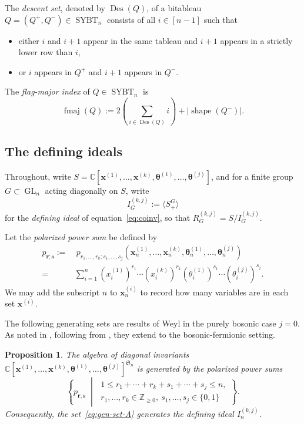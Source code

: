 \documentclass[12pt]{amsart}
\theoremstyle{plain}
\newtheorem{proposition}[theorem]{Proposition}
\theoremstyle{definition}
\DeclareMathOperator{\SYBT}{SYBT}
\DeclareMathOperator{\shape}{shape}
\DeclareMathOperator{\Des}{Des}
\DeclareMathOperator{\fmaj}{fmaj}
\DeclareMathOperator{\GL}{GL}
\newcommand{\Z}{\mathbb{Z}}
\newcommand{\C}{\mathbb{C}}
\begin{document}
The \emph{descent set}, denoted by $\Des(Q)$, of a bitableau $Q = (Q^+,Q^-) \in \SYBT_n$ consists of all $i \in [n-1]$ such that 
\begin{itemize}
\item either $i$ and $i+1$ appear in the same tableau and $i+1$ appears in a strictly lower row than $i$,
\item or $i$ appears in $Q^+$ and $i+1$ appears in $Q^-$.
\end{itemize}
The \emph{flag-major index} of $Q \in \SYBT_n$ is 
\begin{equation}
\fmaj(Q) := 2 \left(\sum_{i \in \Des(Q)} i \right) + |\shape(Q^-)|.
\end{equation}

\subsection{The defining ideals}\label{subsec:defining-ideals}
Throughout, write $S = \C[\bm{x}^{(1)}, \ldots, \bm{x}^{(k)}, \bm{\theta}^{(1)},\ldots, \bm{\theta}^{(j)}]$, and for a finite group $G \subset \GL_n$ acting diagonally on $S$, write
\begin{equation}
    I_G^{(k,j)} := \langle S_+^{G} \rangle
\end{equation}
for the \emph{defining ideal} of equation~\eqref{eq:coinv}, so that $R_G^{(k,j)} = S/I_G^{(k,j)}$.

Let the \emph{polarized power sum} be defined by
\begin{equation}
\begin{aligned}
        p_{\bm{r};\bm{s}} :=& \
        p_{r_1,\ldots,r_k;s_1,\ldots,s_j}(\bm{x}^{(1)}_n,  \ldots, \bm{x}^{(k)}_n,\bm{\theta}_n^{(1)}, \ldots, \bm{\theta}_n^{(j)})\\ 
        =& \sum_{i=1}^n (x_i^{(1)})^{r_1} \cdots (x_i^{(k)})^{r_k} (\theta_i^{(1)})^{s_1} \cdots (\theta_i^{(j)})^{s_j}.
\end{aligned}
\end{equation}
We may add the subscript $n$ to $\bm{x}^{(i)}_n$ to record how many variables are in each set $\bm{x}^{(i)}$.

The following generating sets are results of Weyl \cite{Weyl} in the purely bosonic case $j = 0$. 
As noted in \cite{Zabrocki2019}, following from \cite{OrellanaZabrocki}, they extend to the bosonic-fermionic setting.
\begin{proposition}\label{prop:Weyl-bf}
    The algebra of diagonal invariants
    $\C[\bm{x}^{(1)}, \ldots, \bm{x}^{(k)}, \bm{\theta}^{(1)}, \ldots, \bm{\theta}^{(j)}]^{\mathfrak{S}_n}$ is generated by the polarized power sums
    \begin{equation}\label{eq:gen-set-A}
    \left\{ p_{\bm{r};\bm{s}} \;\middle|\;
    \begin{array}{l}
        1 \leq r_1 + \cdots + r_k + s_1 + \cdots + s_j \leq n, \\
        r_1,\ldots,r_k \in \Z_{\geq 0},\ s_1,\ldots, s_j \in \{0,1\}
    \end{array} \right\}.
\end{equation}
    Consequently, the set~\eqref{eq:gen-set-A} generates the defining ideal $I_{n}^{(k,j)}$.
\end{proposition}
\end{document}
